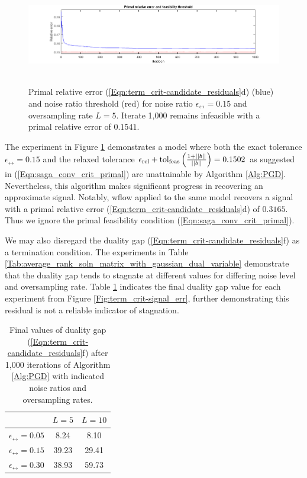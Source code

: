 \begin{enumerate}
\begin{figure}[H]
\centering
\hbox{\hspace{-1.6cm} \includegraphics[scale=0.6]{term_crit-pr_err_fails} }
\caption{Primal relative error (\ref{Eqn:term_crit-candidate_residuals}d) (blue) and noise ratio threshold (red) for noise ratio $\epsilon_\rel = 0.15$ and oversampling rate $L = 5$.  Iterate 1,000 remains infeasible with a primal relative error of $0.1541$.}
\label{Fig:term_crit-pr_err_fails}
\end{figure}


The experiment in Figure \ref{Fig:term_crit-pr_err_fails} demonstrates a model where both the exact tolerance $\epsilon_\rel = 0.15$ and the relaxed tolerance $ \epsilon_{\textnormal{rel}} + \textnormal{tol}_\textnormal{feas} \left(\frac{1 + ||b||}{||b||}\right) =0.1502$ as suggested in (\ref{Eqn:saga_conv_crit_primal}) are unattainable by Algorithm \ref{Alg:PGD}.  Nevertheless, this algorithm makes significant progress in recovering an approximate signal.  Notably, wflow applied to the same model recovers a signal with a primal relative error (\ref{Eqn:term_crit-candidate_residuals}d) of $0.3165$.  Thus we ignore the primal feasibility condition (\ref{Eqn:saga_conv_crit_primal}).


We may also disregard the duality gap (\ref{Eqn:term_crit-candidate_residuals}f) as a termination condition.  The experiments in Table \ref{Tab:average_rank_soln_matrix_with_gaussian_dual_variable} demonstrate that the duality gap tends to stagnate at different values for differing noise level and oversampling rate.  Table \ref{Tab:term_crit-duality_gap_stagnates} indicates the final duality gap value for each experiment from Figure \ref{Fig:term_crit-signal_err}, further demonstrating this residual is not a reliable indicator of stagnation.

\begin{table}[H]
\centering
\begin{tabular}{ |c|c|c| }
\hline
&	$L = 5$
	&	$L = 10$	\\
 \hline
$\epsilon_\rel = 0.05$
&     8.24 &   8.10 		\\
 \hline
$\epsilon_\rel = 0.15$
&  39.23 &  29.41 	\\
 \hline
$\epsilon_\rel = 0.30$
&  38.93 &  59.73	\\
 \hline
\end{tabular}
	\caption{Final values of duality gap (\ref{Eqn:term_crit-candidate_residuals}f) after 1,000 iterations of Algorithm \ref{Alg:PGD} with indicated noise ratios and oversampling rates.}
	\label{Tab:term_crit-duality_gap_stagnates}
\end{table}


\end{enumerate}

